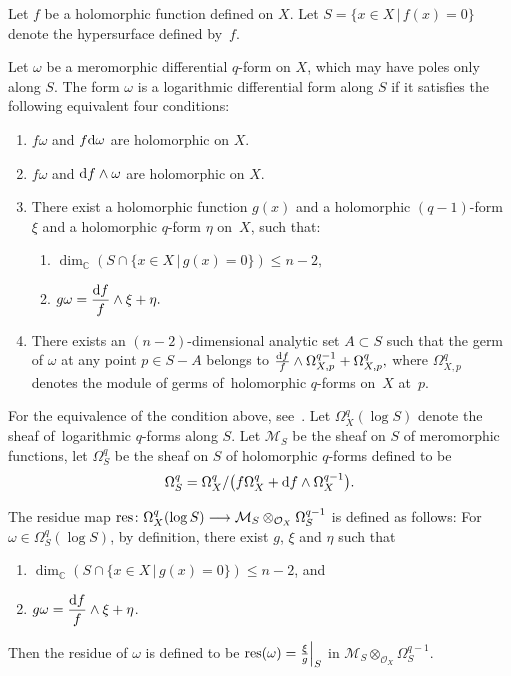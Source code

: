 \documentclass[pdftex]{sigma}%
\numberwithin{equation}{section}
\begin{document}
Let $f$ be a holomorphic function defined on $X$. Let $S=\{ x \in X \,|\, f(x)=0 \} $ denote the hypersurface defined by~$ f$.

\begin{Definition}\label{def1}
Let $\omega $ be a meromorphic differential $q$-form on $X$, which may have poles only along $S$. The form $\omega$ is a logarithmic differential form along $S$ if it satisfies the following equi\-valent four conditions:
\begin{enumerate}\itemsep=0pt
\item[$(i)$] $f\omega$ and $f{\rm d}\omega$ are holomorphic on $X$.
\item[$(ii)$] $f\omega$ and ${\rm d}f \wedge \omega$ are holomorphic on $X$.
\item[$(iii)$] There exist a holomorphic function $g(x)$ and a holomorphic $(q-1)$-form $\xi$ and a holomorphic $q$-form $\eta$ on~$X$,
such that:
\begin{enumerate}\itemsep=0pt
\item[$(a)$] $\dim_{\mathbb C}( S \cap \{x \in X \,|\, g(x)=0 \}) \leq n-2, $
\item[$(b)$] ${\displaystyle g\omega = \frac{{\rm d}f}{f} \wedge \xi + \eta.}$
\end{enumerate}
\item[$(iv)$] There exists an $ (n-2)$-dimensional analytic set $A \subset S$ such that the germ of $\omega$ at any point $ p \in S-A$ belongs to $ {\frac{{\rm d}f}{f} \wedge \Omega_{X, p}^{q-1} + \Omega_{X,p}^{q}},$ where $ \Omega_{X,p}^{q}$ denotes the module of germs of~holomorphic $q$-forms on~$X$ at~$p$.
\end{enumerate}
\end{Definition}


For the equivalence of the condition above, see~\cite{S}.
Let $\Omega_X^{q}(\log S)$ denote the sheaf of~loga\-rith\-mic $q$-forms along $S$.
Let ${\mathcal M}_{S}$ be the sheaf on $S$ of meromorphic functions, let $\Omega_{S}^{q}$ be the sheaf on $S$ of holomorphic $q$-forms defined to be
\begin{gather*}
\Omega_{S}^{q} = \Omega_{X}^{q}/\big(f\Omega_X^{q} + {\rm d}f\wedge \Omega_{X}^{q-1}\big).
\end{gather*}

\begin{Definition}
The residue map ${\rm res}\colon \Omega_X^{q}(\log S) \longrightarrow {\mathcal M}_S \otimes_{{\mathcal O}_X}\Omega_S^{q-1} $ is defined as follows: For~$\omega \in \Omega_S^{q}(\log S)$, by definition,
there exist $ g$, $\xi$ and $\eta$ such that
\begin{enumerate}\itemsep=0pt
\item[$(a)$] $\dim_{\mathbb C}( S \cap \{x \in X \,|\, g(x)=0 \}) \leq n-2$, and
\item[$(b)$] ${\displaystyle g\omega = \frac{{\rm d}f}{f} \wedge \xi + \eta}$.
\end{enumerate}
Then the residue of $\omega$ is defined to be
$ {\rm res}(\omega) = \frac{\xi}{g}\Big|_S$ in $ {\mathcal M}_S \otimes_{{\mathcal O}_X}\Omega_S^{q-1}$.
\end{Definition}
\end{document}
